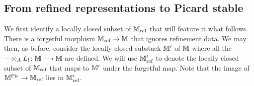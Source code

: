 \documentclass[12pt]{amsart}
\begin{document}




\subsection{From refined representations to Picard stable}

We first identify a locally closed subset of $\mathbb{M}_\text{ref}$ that will feature it what follows.
There is a forgetful morphism $\mathbb{M}_\text{ref} \rightarrow \mathbb{M}$ that ignores refinement data.
We may then, as before, consider the locally closed substack $\mathbb{M}'$ of $\mathbb{M}$ where all the $-\otimes_A L_l \colon \mathbb{M} \dashrightarrow \mathbb{M}$ are defined.
We will use $\mathbb{M}_\text{ref}'$ to denote the locally closed subset of $\mathbb{M}_\text{ref}$ that maps to $\mathbb{M}'$ under the forgetful map.
Note that the image of $\mathbb{M}^{\operatorname{Pic}} \rightarrow \mathbb{M}_\text{ref}$ lies in $\mathbb{M}_\text{ref}'$.
\end{document}
